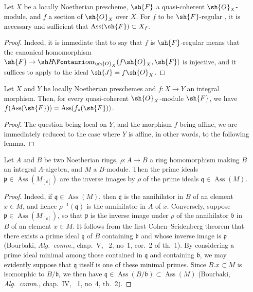 \begin{corollary}[3.1.9]
\label{IV.3.1.9}
Let $X$ be a locally Noetherian prescheme, $\sh{F}$ a quasi-coherent $\sh{O}_X$-module, and $f$ a section of $\sh{O}_X$ over $X$.
For $f$ to be $\sh{F}$-regular , it is necessary and sufficient that $\operatorname{Ass}(\sh{F})\subset X_f$.
\end{corollary}

\begin{proof}
Indeed, it is immediate that to say that $f$ is $\sh{F}$-regular means that the canonical homomorphism $\sh{F}\to\shHom_{\sh{O}_X}(f\sh{O}_X,\sh{F})$ is injective, and it suffices to apply  to the ideal $\sh{J}=f\sh{O}_X$.
\end{proof}

\begin{proposition}[3.1.10]
\label{IV.3.1.10}
Let $X$ and $Y$ be locally Noetherian preschemes and $f:X\to Y$ an integral morphism.
Then, for every quasi-coherent $\sh{O}_X$-module $\sh{F}$, we have $f(\operatorname{Ass}(\sh{F}))=\operatorname{Ass}(f_*(\sh{F}))$.
\end{proposition}

\begin{proof}
The question being local on $Y$, and the morphism $f$ being affine, we are immediately reduced to the case where $Y$ is affine, in other words, to the following lemma.
\end{proof}


\begin{lemma}[3.1.10.1]
\label{IV.3.1.10.1}
Let $A$ and $B$ be two Noetherian rings, $\rho:A\to B$ a ring homomorphism making $B$ an integral $A$-algebra, and $M$ a $B$-module.
Then the prime ideals $\mathfrak{p}\in\operatorname{Ass}(M_{[\rho]})$ are the inverse images by $\rho$ of the prime ideals $\mathfrak{q}\in\operatorname{Ass}(M)$.
\end{lemma}

\begin{proof}
Indeed, if $\mathfrak{q}\in\operatorname{Ass}(M)$, then $\mathfrak{q}$ is the annihilator in $B$ of an element $x\in M$, and hence $\rho^{-1}(\mathfrak{q})$ is the annihilator in $A$ of $x$. Conversely, suppose $\mathfrak{p}\in\operatorname{Ass}(M_{[\rho]})$, so that $\mathfrak{p}$ is the inverse image under $\rho$ of the annihilator $\mathfrak{b}$ in $B$ of an element $x\in M$. It follows from the first Cohen--Seidenberg theorem that there exists a prime ideal $\mathfrak{q}$ of $B$ containing $\mathfrak{b}$ and whose inverse image is $\mathfrak{p}$ (Bourbaki, \emph{Alg.\ comm.}, chap.~V, \textsection~2, no~1, cor.~2 of th.~1). By considering a prime ideal minimal among those contained in $\mathfrak{q}$ and containing $\mathfrak{b}$, we may evidently suppose that $\mathfrak{q}$ itself is one of these minimal primes. Since $B.x\subset M$ is isomorphic to $B/\mathfrak{b}$, we then have $\mathfrak{q}\in\operatorname{Ass}(B/\mathfrak{b})\subset\operatorname{Ass}(M)$ (Bourbaki, \emph{Alg.\ comm.}, chap.~IV, \textsection~1, no~4, th.~2).
\end{proof}

